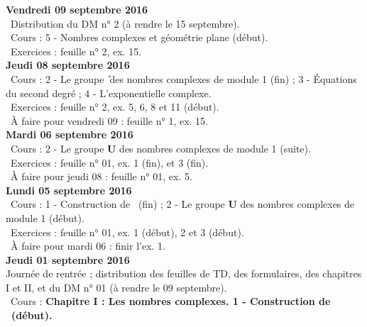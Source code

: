\documentclass[12pt,a4paper]{article}
\begin{document}
\noindent\textbf{Vendredi 09 septembre 2016}\\
\bu\ Distribution du DM n° 2 (à rendre le 15 septembre).\\
\bu\ Cours : 5 - Nombres complexes et géométrie plane (début).\\
\bu\ Exercices : feuille n° 2, ex. 15.\vspace{.4cm}\\

\noindent\textbf{\bf Jeudi 08 septembre 2016}\\
\bu\ Cours : 2 - Le groupe \U\ des nombres complexes de 
module 1 (fin) ; 3 - Équations du second degré ; 4 - L'exponentielle complexe.\\
\bu\ Exercices : feuille n° 2, ex. 5, 6, 8 et 11 (début).\\
\bu\ À faire pour vendredi 09 : feuille n° 1, ex. 15.\vspace{.4cm}\\
  
\noindent\textbf{\bf Mardi 06 septembre 2016}\\
\bu\ Cours : 2 - Le groupe \textbf{U} des nombres complexes de 
module 1 (suite).\\
\bu\ Exercices : feuille n° 01, ex. 1 (fin), et 3 (fin).\\
\bu\ À faire pour jeudi 08 : feuille n° 01, ex. 5.\vspace{.4cm}\\

\noindent\textbf{\bf Lundi 05 septembre 2016}\\
\bu\ Cours : 1 - Construction de \C\ (fin) ; 2 - Le groupe \textbf{U} des nombres complexes de 
module 1 (début).\\
\bu\ Exercices : feuille n° 01, ex. 1 (début), 2 et 3 (début).\\
\bu\ À faire pour mardi 06 : finir l'ex. 1.\vspace{.4cm}\\

\noindent\textbf{\bf Jeudi 01 septembre 2016}\\
Journée de rentrée ; distribution des feuilles de TD, des formulaires, des
chapitres I et II, et du DM n° 01 (à rendre le 09 septembre).\\
\bu\ Cours : \bf Chapitre I \rm : Les nombres complexes. 1 - Construction
de \C\ (début).\vspace{.4cm}\\


\label{end}
\end{document}
